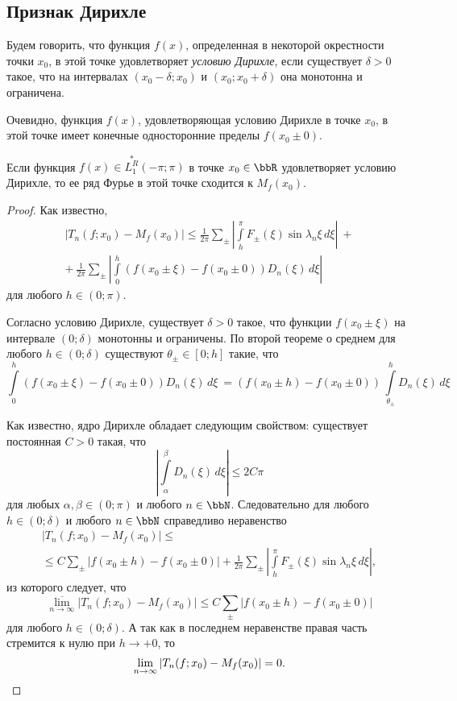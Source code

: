
\subsection{Признак Дирихле}
Будем говорить, что функция $f(x)$, определенная в некоторой окрестности точки $x_0$, в этой точке удовлетворяет \textit{условию Дирихле}, если существует $\delta > 0$ такое, что на интервалах $(x_0 - \delta;x_0)$ и $(x_0;x_0 + \delta)$ она монотонна и ограничена.

Очевидно, функция $f(x)$, удовлетворяющая условию Дирихле в точке $x_0$, в этой точке имеет конечные односторонние пределы $f(x_0\pm 0)$.
\begin{thm} \label{ch17thm5}
Если функция $f(x) \in \overset{*}{L^{R}_1}(-\pi;\pi)$ в точке $x_0 \in \bbR$ удовлетворяет условию Дирихле, то ее ряд Фурье в этой точке сходится к $M_f(x_0)$.
\end{thm}
\begin{proof}
Как известно,
\begin{multline*}
|T_n(f; x_0) - M_f(x_0)| \le \frac{1}{2\pi} \sum_{\pm} \left|\int\limits_{h}^{\pi} F_{\pm}(\xi) \sin{\lambda_n \xi} \,d\xi \right|\ +\\
+\ \frac{1}{2\pi} \sum_{\pm} \left|\int\limits_{0}^{h} (f(x_0\pm \xi) - f(x_0\pm 0))D_n(\xi) \,d\xi \right|
\end{multline*}
для любого $h \in (0;\pi)$.

Согласно условию Дирихле, существует $\delta > 0$ такое, что функции $f(x_0\pm \xi)$ на интервале $(0;\delta)$ монотонны и ограничены. По второй теореме о среднем для любого $h \in (0;\delta)$ существуют $\theta_{\pm} \in [0;h]$ такие, что
$$
\int\limits_{0}^{h} (f(x_0\pm \xi) - f(x_0\pm 0))D_n(\xi) \,d\xi\ = (f(x_0\pm h) - f(x_0\pm 0))\, \int\limits_{\theta_{\pm}}^{h} D_n(\xi)\,d\xi
$$

Как известно, ядро Дирихле обладает следующим свойством: существует постоянная $C > 0$ такая, что
$$
\left|\int\limits_{\alpha}^{\beta} D_n(\xi)\,d\xi\right| \le 2C\pi
$$
для любых $\alpha, \beta \in (0;\pi)$ и любого $n \in \bbN$. Следовательно для любого $h \in (0;\delta)$ и любого $n \in \bbN$ справедливо неравенство
\begin{multline*}
|T_n(f; x_0) - M_f(x_0)| \le\\
\le C\sum_{\pm}|f(x_0\pm h) - f(x_0\pm 0)| + \frac{1}{2\pi} \sum_{\pm} \left|\int\limits_{h}^{\pi} F_{\pm}(\xi) \sin{\lambda_n \xi} \,d\xi \right|,
\end{multline*}
из которого следует, что
$$
\overline{\lim\limits_{n \to \infty}}|T_n(f; x_0) - M_f(x_0)| \le C\sum_{\pm}|f(x_0\pm h) - f(x_0\pm 0)|
$$
для любого $h \in (0;\delta)$. А так как в последнем неравенстве правая часть стремится к нулю при $h \to +0$, то
\begin{equation*}
\lim\limits_{n \to \infty}|T_n(f; x_0) - M_f(x_0)| = 0. \qedhere
\end{equation*}
\end{proof}

